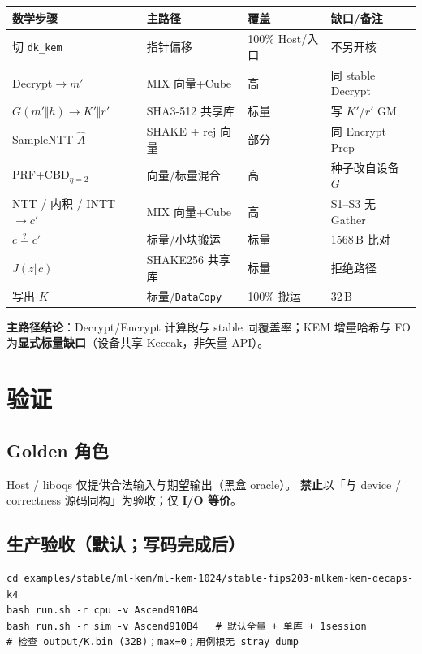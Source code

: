 \documentclass[UTF8,a4paper,11pt]{ctexart}
\begin{document}
\begin{longtable}{@{}L{3.8cm}L{3.6cm}L{1.4cm}L{4.0cm}@{}}
\toprule
数学步骤 & 主路径 & 覆盖 & 缺口/备注 \\
\midrule
切 \texttt{dk\_kem} & 指针偏移 & 100\% Host/入口 & 不另开核 \\
Decrypt$\to m'$ & MIX 向量+Cube & 高 & 同 stable Decrypt \\
$G(m'\Vert h)\to K'\Vert r'$ & SHA3-512 共享库 & 标量 & 写 $K'$/$r'$ GM \\
SampleNTT $\hat{A}$ & SHAKE + rej 向量 & 部分 & 同 Encrypt Prep \\
PRF+CBD$_{\eta=2}$ & 向量/标量混合 & 高 & 种子改自设备 $G$ \\
NTT / 内积 / INTT$\to c'$ & MIX 向量+Cube & 高 & S1--S3 无 Gather \\
$c\stackrel{?}{=}c'$ & 标量/小块搬运 & 标量 & 1568\,B 比对 \\
$J(z\Vert c)$ & SHAKE256 共享库 & 标量 & 拒绝路径 \\
写出 $K$ & 标量/\texttt{DataCopy} & 100\% 搬运 & 32\,B \\
\bottomrule
\end{longtable}

\textbf{主路径结论}：Decrypt/Encrypt 计算段与 stable 同覆盖率；KEM 增量哈希与 FO
为\textbf{显式标量缺口}（设备共享 Keccak，非矢量 API）。

\section{验证}
\label{sec:verify}

\subsection{Golden 角色}

Host / liboqs 仅提供合法输入与期望输出（黑盒 oracle）。
\textbf{禁止}以「与 device / correctness 源码同构」为验收；仅 \textbf{I/O 等价}。

\subsection{生产验收（默认；写码完成后）}

\begin{verbatim}
cd examples/stable/ml-kem/ml-kem-1024/stable-fips203-mlkem-kem-decaps-k4
bash run.sh -r cpu -v Ascend910B4
bash run.sh -r sim -v Ascend910B4   # 默认全量 + 单库 + 1session
# 检查 output/K.bin (32B)；max=0；用例根无 stray dump
\end{verbatim}
\end{document}
